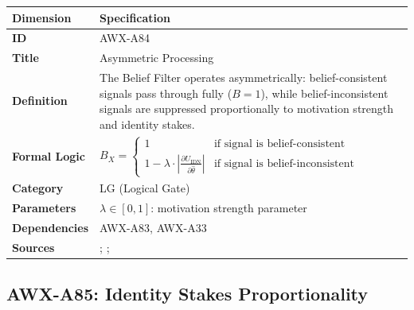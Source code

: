\begin{table}[htbp]
\small
\begin{tabular}{p{3cm}p{11cm}}
\toprule
\textbf{Dimension} & \textbf{Specification} \\
\midrule
\textbf{ID} & AWX-A84 \\
\textbf{Title} & Asymmetric Processing \\
\textbf{Definition} & The Belief Filter operates asymmetrically: belief-consistent signals pass through fully ($B=1$), while belief-inconsistent signals are suppressed proportionally to motivation strength and identity stakes. \\
\textbf{Formal Logic} & $B_X = \begin{cases} 1 & \text{if signal is belief-consistent} \\ 1 - \lambda \cdot \left| \frac{\partial U_{\text{IDN}}}{\partial \hat{\theta}} \right| & \text{if signal is belief-inconsistent} \end{cases}$ \\
\textbf{Category} & LG (Logical Gate) \\
\textbf{Parameters} & $\lambda \in [0,1]$: motivation strength parameter \\
\textbf{Dependencies} & AWX-A83, AWX-A33 \\
\textbf{Sources} & \citet{benabou2015economics}; \citet{taber2006motivated}; \citet{kahan2017motivated} \\
\bottomrule
\end{tabular}
\end{table}


\subsection{AWX-A85: Identity Stakes Proportionality}

